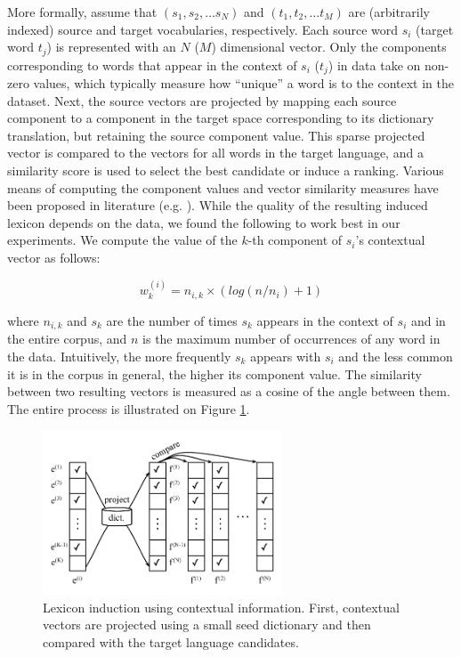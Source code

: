 \documentclass{article}
\begin{document}
More formally, assume that $(s_{1}, s_{2}, \dots s_{N})$ and $(t_{1}, t_{2}, \dots t_{M})$ are (arbitrarily indexed) source and target vocabularies, respectively.  Each source word $s_{i}$ (target word $t_{j}$) is represented with an $N$ ($M$) dimensional vector.  Only the components corresponding to words that appear in the context of $s_{i}$ ($t_{j}$) in data take on non-zero values, which typically measure how ``unique'' a word is to the context in the dataset.  Next, the source vectors are projected by mapping each source component to a component in the target space corresponding to its dictionary translation, but retaining the source component value.  This sparse projected vector is compared to the vectors for all words in the target language, and a similarity score is used to select the best candidate or induce a ranking.  Various means of computing the component values and vector similarity measures have been proposed in literature (e.g. \cite{Rapp:1999,Fung:1998}).  While the quality of the resulting induced lexicon depends on the data, we found the following to work best in our experiments.  We compute the value of the $k$-th component of $s_{i}$'s contextual vector  as follows: 

\begin{equation}
w_{k}^{(i)} = n_{i,k} \times (log( {n / n_{i}}) + 1)
\end{equation}

where $n_{i,k}$ and $s_{k}$ are the number of times $s_{k}$ appears in the context of $s_{i}$ and in the entire corpus, and $n$ is the maximum number of occurrences of any word in the data.  Intuitively, the more frequently $s_{k}$ appears with $s_{i}$ and the less common it is in the corpus in general, the higher its component value.  The similarity between two resulting vectors is measured as a cosine of the angle between them.  The entire process is illustrated on Figure \ref{fig:contextual}.\\

\begin{figure}
\centerline{\mbox{\includegraphics[width=2.8in]{figures/contextual}}}
\caption{Lexicon induction using contextual information. First, contextual vectors are projected using a small seed dictionary and then compared with the target language candidates.}
\label{fig:contextual}
\end{figure}
\end{document}
